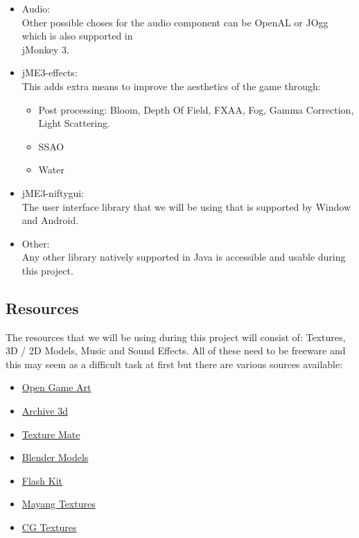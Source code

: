 \documentclass[letterpaper]{article}
\begin{document}
\begin{itemize}
				\item Audio: \\
					Other possible choses for the audio component can be OpenAL or JOgg which is also supported in \\ jMonkey 3.
				
				\item jME3-effects:\\
					This adds extra means to improve the aesthetics of the game through:
						\begin{itemize}
							\item Post processing: Bloom, Depth Of Field, FXAA, Fog, Gamma Correction, Light Scattering.
							\item SSAO
							\item Water
						\end{itemize}
					
				\item jME3-niftygui: \\
					The user interface library that we will be using that is supported by Window and Android.
				
				\item Other: \\
				Any other library natively supported in Java is accessible and usable during this project.
			
			\end{itemize}
			
			\vspace{0.1cm}
			
			\subsection*{Resources}
			
			\vspace{0.1cm}
			
			The resources that we will be using during this project will consist of: Textures, 3D / 2D Models, Music and Sound Effects. All of these need to be freeware and this may seem as a difficult task at first but there are various sources available:
			\begin{itemize}
				\item \href{http://www.opengameart.org}{Open Game Art}
				\item \href{http://www.archive3d.net}{Archive 3d}
				\item \href{http://www.texturemate.com}{Texture Mate}
				\item \href{http://www.blender-models.com}{Blender Models}
				\item \href{http://www.flashkit.com}{Flash Kit}
				\item \href{http://www.mayang.com/textures/}{Mayang Textures}
				\item \href{http://www.cgtextures.com}{CG Textures}
			\end{itemize}
\end{document}

